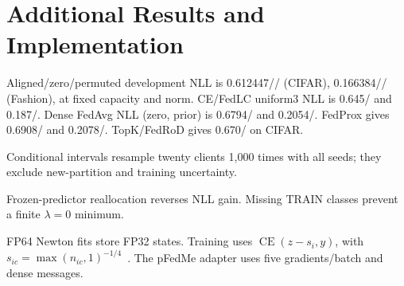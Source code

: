 \appendix
\section{Additional Results and Implementation}\label{app:complete}
Aligned/\allowbreak zero/\allowbreak permuted development NLL is 0.612447// (CIFAR), 0.166384// (Fashion), at fixed capacity and norm. CE/\allowbreak FedLC uniform3 NLL is 0.645/ and 0.187/. Dense FedAvg NLL (zero, prior) is 0.6794/ and 0.2054/. FedProx gives 0.6908/ and 0.2078/. TopK/\allowbreak FedRoD gives 0.670/ on CIFAR.\par
\label{app:statistics}Conditional intervals resample twenty clients 1,000 times with all seeds; they exclude new-partition and training uncertainty.\par
\label{app:sensitivity}Frozen-predictor reallocation reverses NLL gain. Missing TRAIN classes prevent a finite $\lambda=0$ minimum.\par
\label{app:implementation}FP64 Newton fits store FP32 states. Training uses $\operatorname{CE}(z-s_i,y)$, with $s_{ic}=\max(n_{ic},1)^{-1/\allowbreak 4}$~\cite{zhang2022fedlc}. The pFedMe adapter uses five gradients/\allowbreak batch and dense messages.
